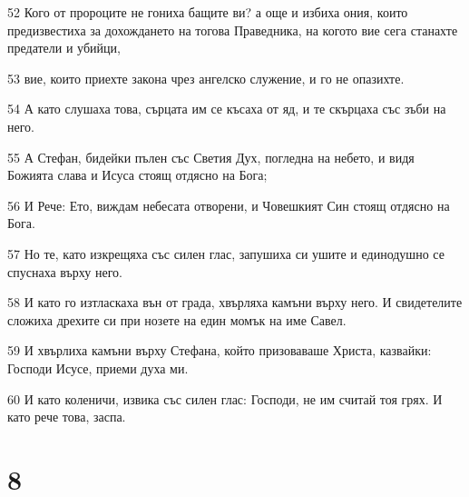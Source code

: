 \par 52 Кого от пророците не гониха бащите ви? а още и избиха ония, които предизвестиха за дохождането на тогова Праведника, на когото вие сега станахте предатели и убийци,
\par 53 вие, които приехте закона чрез ангелско служение, и го не опазихте.
\par 54 А като слушаха това, сърцата им се късаха от яд, и те скърцаха със зъби на него.
\par 55 А Стефан, бидейки пълен със Светия Дух, погледна на небето, и видя Божията слава и Исуса стоящ отдясно на Бога;
\par 56 И Рече: Ето, виждам небесата отворени, и Човешкият Син стоящ отдясно на Бога.
\par 57 Но те, като изкрещяха със силен глас, запушиха си ушите и единодушно се спуснаха върху него.
\par 58 И като го изтласкаха вън от града, хвърляха камъни върху него. И свидетелите сложиха дрехите си при нозете на един момък на име Савел.
\par 59 И хвърлиха камъни върху Стефана, който призоваваше Христа, казвайки: Господи Исусе, приеми духа ми.
\par 60 И като коленичи, извика със силен глас: Господи, не им считай тоя грях. И като рече това, заспа.

\chapter{8}


